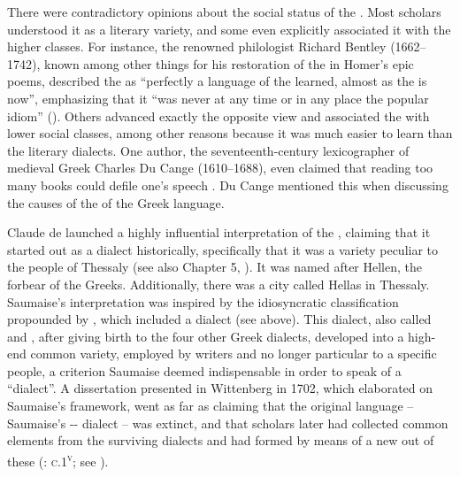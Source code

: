 There were contradictory opinions about the social status of the . Most scholars understood it as a literary variety, and some even explicitly associated it with the higher classes. For instance, the renowned  philologist Richard Bentley (1662–1742), known among other things for his restoration of the  in Homer’s epic poems, described the  as “perfectly a language of the learned, almost as the  is now”, emphasizing that it “was never at any time or in any place the popular idiom” (\citeyear[406]{Bentley1699}). Others advanced exactly the opposite view and associated the  with lower social classes, among other reasons because it was much easier to learn than the literary dialects. One author, the seventeenth-century  lexicographer of medieval Greek Charles Du Cange (1610–1688), even claimed that reading too many  books could defile one’s speech \citep[iv]{Du1688}. Du Cange mentioned this when discussing the causes of the  of the Greek language.

Claude de \citet[esp. 405--406]{Saumaise1643a} launched a highly influential interpretation of the , claiming that it started out as a dialect historically, specifically that it was a variety peculiar to the people of Thessaly (see also Chapter 5, ). It was named  after Hellen, the forbear of the Greeks. Additionally, there was a city called Hellas in Thessaly. Saumaise's interpretation was inspired by the idiosyncratic classification propounded by , which included a  dialect (see  above). This  dialect, also called  and , after giving birth to the four other Greek dialects, developed into a high-end common variety, employed by writers and no longer particular to a specific people, a criterion Saumaise deemed indispensable in order to speak of a “dialect”. A dissertation presented in Wittenberg in 1702, which elaborated on Saumaise’s framework, went as far as claiming that the original  language – Saumaise’s -- dialect – was extinct, and that scholars later had collected common elements from the surviving dialects and had formed by means of  a new  out of these (\citealt{Schwartz1702}: \textsc{c}.1\textsc{\textsuperscript{v}}; see \citealt[]{VanRooyFce}).

